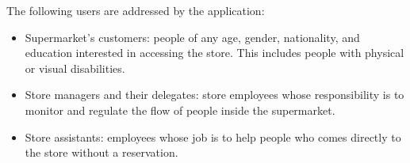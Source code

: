 \documentclass[../../main.tex]{subfiles}
\begin{document}
	The following users are addressed by the application:
	\begin{itemize}
		\item Supermarket's customers: people of any age, gender, nationality, and education interested in accessing the store. This includes people with physical or visual disabilities.
		\item Store managers and their delegates: store employees whose responsibility is to monitor and regulate the flow of people inside the supermarket.
		\item Store assistants: employees whose job is to help people who comes directly to the store without a reservation.
	\end{itemize}
\end{document}
